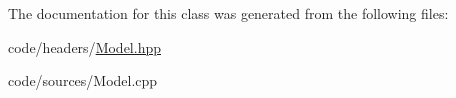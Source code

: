 The documentation for this class was generated from the following files\+:\begin{DoxyCompactItemize}
\item 
code/headers/\mbox{\hyperlink{_model_8hpp}{Model.\+hpp}}\item 
code/sources/Model.\+cpp\end{DoxyCompactItemize}
